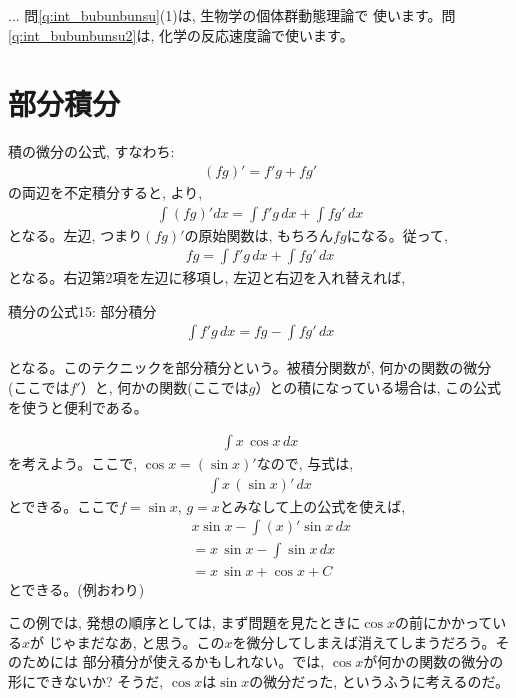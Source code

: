 \begin{faq}{\small{}
... 問\ref{q:int_bubunbunsu}(1)は, 生物学の個体群動態理論で
使います。問\ref{q:int_bubunbunsu2}は, 化学の反応速度論で使います。}\end{faq}
\vv


\section{部分積分}
積の微分の公式, すなわち:
\begin{eqnarray}(fg)'=f'g+fg'\end{eqnarray}
の両辺を不定積分すると, より, 
\begin{eqnarray}\int (fg)' dx=\int f'g\, dx + \int fg'\, dx\end{eqnarray}
となる。左辺, つまり$(fg)'$の原始関数は, もちろん$fg$になる。従って, 
\begin{eqnarray}fg=\int f'g\, dx + \int fg'\, dx\end{eqnarray}
となる。右辺第2項を左辺に移項し, 左辺と右辺を入れ替えれば, 
\begin{itembox}{積分の公式15: 部分積分}
\begin{eqnarray}
\int f'g\, dx = fg - \int fg'\, dx
\end{eqnarray}
\end{itembox}
となる。このテクニックを部分積分という。被積分関数が, 何かの関数の微分
(ここでは$f'$）と, 何かの関数(ここでは$g$）との積になっている場合は, 
この公式を使うと便利である。

\begin{exmpl}
\begin{eqnarray}\int x\, \cos x\, dx\end{eqnarray}
を考えよう。ここで, $\cos x=(\sin x)'$なので, 与式は, 
\begin{eqnarray}\int x\, (\sin x)'\, dx\end{eqnarray}
とできる。ここで$f=\sin x$, $g=x$とみなして上の公式を使えば, 
\begin{eqnarray*}
&&x \sin x - \int (x)' \sin x\, dx\\ 
&&= x\, \sin x - \int \sin x\, dx\\
&&= x\, \sin x + \cos x +C
\end{eqnarray*}
とできる。(例おわり)\end{exmpl}

この例では, 発想の順序としては, まず問題を見たときに$\cos x$の前にかかっている$x$が
じゃまだなあ, と思う。この$x$を微分してしまえば消えてしまうだろう。そのためには
部分積分が使えるかもしれない。では, $\cos x$が何かの関数の微分の形にできないか? 
そうだ, $\cos x$は$\sin x$の微分だった, というふうに考えるのだ。\hv

